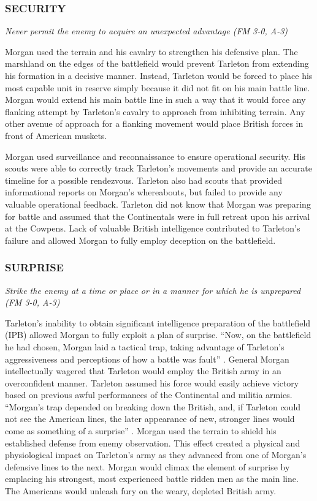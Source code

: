 \subsubsection{SECURITY}

\textit{Never permit the enemy to acquire an unexpected advantage (FM 3-0,
A-3)}

Morgan used the terrain and his cavalry to strengthen his defensive plan.  The
marshland on the edges of the battlefield would prevent Tarleton from extending
his formation in a decisive manner.  Instead, Tarleton would be forced to place
his most capable unit in reserve simply because it did not fit on his main
battle line.  Morgan would extend his main battle line in such a way that it
would force any flanking attempt by Tarleton’s cavalry to approach from
inhibiting terrain.  Any other avenue of approach for a flanking movement would
place British forces in front of American muskets.  

Morgan used surveillance and reconnaissance to ensure operational security.
His scouts were able to correctly track Tarleton’s movements and provide an
accurate timeline for a possible rendezvous.  Tarleton also had scouts that
provided informational reports on Morgan’s whereabouts, but failed to provide
any valuable operational feedback.  Tarleton did not know that Morgan was
preparing for battle and assumed that the Continentals were in full retreat
upon his arrival at the Cowpens.  Lack of valuable British intelligence
contributed to Tarleton’s failure and allowed Morgan to fully employ deception
on the battlefield.   

\subsubsection{SURPRISE}

\textit{Strike the enemy at a time or place or in a manner for which he is
unprepared (FM 3-0, A-3)}

Tarleton’s inability to obtain significant intelligence preparation of the
battlefield (IPB) allowed Morgan to fully exploit a plan of surprise.   “Now,
on the battlefield he had chosen, Morgan laid a tactical trap, taking advantage
of Tarleton’s aggressiveness and perceptions of how a battle was fault”
\cite[p.61]{babits_devil_2001}.  General Morgan intellectually wagered that Tarleton would
employ the British army in an overconfident manner.  Tarleton assumed his force
would easily achieve victory based on previous awful performances of the
Continental and militia armies.  “Morgan’s trap depended on breaking down the
British, and, if Tarleton could not see the American lines, the later
appearance of new, stronger lines would come as something of a surprise”
\cite[p.82]{babits_devil_2001}.  Morgan used the terrain to shield his established defense from
enemy observation.  This effect created a physical and physiological impact on
Tarleton’s army as they advanced from one of Morgan’s defensive lines to the
next.  Morgan would climax the element of surprise by emplacing his strongest,
most experienced battle ridden men as the main line.  The Americans would
unleash fury on the weary, depleted British army.   

